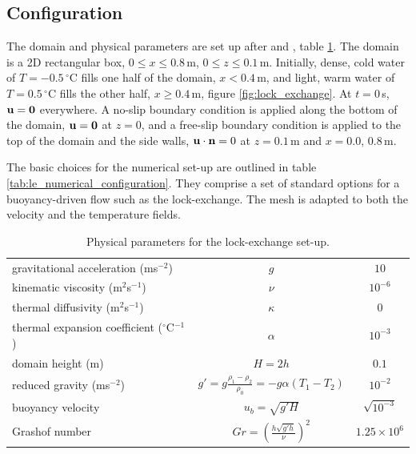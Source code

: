 \subsection{Configuration}
\label{sect:lock_exchange_configuration}

The domain and physical parameters are set up after \cite{fringer_06} and \cite{ozgokmen_07}, table \ref{tab:le_physical_parameters}. The domain is a 2D rectangular box, $0\leq x \leq 0.8\,$m, $0 \leq z \leq 0.1\,$m. Initially, dense, cold water of $T = -0.5\,^\circ$C fills one half of the domain, $x<0.4\,$m, and light, warm water of $T = 0.5\,^\circ$C fills the other half, $x\geq0.4\,$m, figure \ref{fig:lock_exchange}. At $t=0\,$s, ${\bf u} = {\bf 0}$ everywhere. A no-slip boundary condition is applied along the bottom of the domain, ${\bf u = 0}$ at $z=0$, and a free-slip boundary condition is applied to the top of the domain and the side walls, ${\bf u\cdot\bf n} = 0$ at $z = 0.1\,$m and $x = 0.0,\, 0.8\,$m.

The basic choices for the numerical set-up are outlined in table \ref{tab:le_numerical_configuration}. They comprise a set of standard options for a buoyancy-driven flow such as the lock-exchange. The mesh is adapted to both the velocity and the temperature fields.  

\begin{table}[th]
\centering
\begin{tabular}[h]{l   c  c }  \hline
gravitational acceleration (ms$^{-2}$)			& $g$ 								& $10$  \\
kinematic viscosity (m$^2$s$^{-1}$)			& $\nu$								& $10^{-6}$  \\
thermal diffusivity (m$^2$s$^{-1}$)					& $\kappa$ 					& 0  \\
thermal expansion coefficient ($^\circ$C$^{-1}$)	& $\alpha$ 							& $10^{-3}$ \\ 
domain height (m)					& $H = 2h$							& $0.1$ \\ %
reduced gravity	(ms$^{-2}$)				& $g' = g\frac{\rho_1 - \rho_2}{\rho_0} = -g\alpha (T_1 - T_2)$	& $10^{-2}$  \\
buoyancy velocity					& $u_b = \sqrt{g'H}$ 						& $\sqrt{10^{-3}}$ \\
Grashof number						& $Gr = \left( \frac{h \sqrt{g'h}}{\nu} \right)^2$ 		& $1.25 \times 10^{6}$\\ \hline
\end{tabular}
\caption{Physical parameters for the lock-exchange set-up.}
\label{tab:le_physical_parameters}
\end{table}

